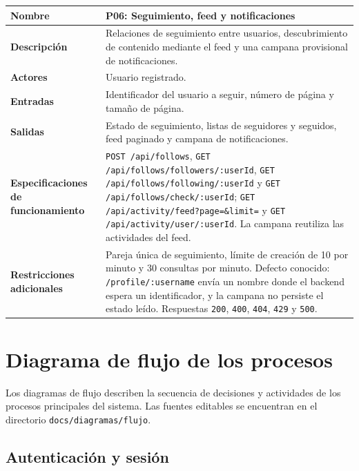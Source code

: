 \documentclass[doc,12pt,a4paper]{apa7}
\begin{document}
\begin{longtable}{|P{3.3cm}|L{11.2cm}|}
\hline
\textbf{Nombre} & P06: Seguimiento, feed y notificaciones \\ \hline
\textbf{Descripción} & Relaciones de seguimiento entre usuarios, descubrimiento de contenido mediante el feed y una campana provisional de notificaciones. \\ \hline
\textbf{Actores} & Usuario registrado. \\ \hline
\textbf{Entradas} & Identificador del usuario a seguir, número de página y tamaño de página. \\ \hline
\textbf{Salidas} & Estado de seguimiento, listas de seguidores y seguidos, feed paginado y campana de notificaciones. \\ \hline
\textbf{Especificaciones de funcionamiento} & \texttt{POST /api/follows}, \texttt{GET /api/follows/followers/:userId}, \texttt{GET /api/follows/following/:userId} y \texttt{GET /api/follows/check/:userId}; \texttt{GET /api/activity/feed?page=\&limit=} y \texttt{GET /api/activity/user/:userId}. La campana reutiliza las actividades del feed. \\ \hline
\textbf{Restricciones adicionales} & Pareja única de seguimiento, límite de creación de 10 por minuto y 30 consultas por minuto. Defecto conocido: \texttt{/profile/:username} envía un nombre donde el backend espera un identificador, y la campana no persiste el estado leído. Respuestas \texttt{200}, \texttt{400}, \texttt{404}, \texttt{429} y \texttt{500}. \\ \hline
\end{longtable}

\section{Diagrama de flujo de los procesos}

Los diagramas de flujo describen la secuencia de decisiones y actividades de los procesos principales del sistema. Las fuentes editables se encuentran en el directorio \texttt{docs/diagramas/flujo}.

\subsection{Autenticación y sesión}
\end{document}
